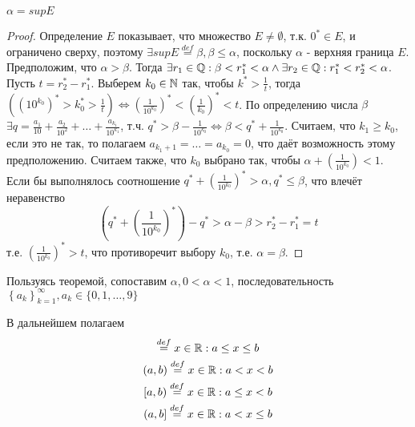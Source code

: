 \documentclass[main]{subfiles}
\begin{document}
\begin{theorem}
    $\alpha = supE$
\end{theorem}
\begin{proof}
    Определение $E$ показывает, что множество $E \neq \emptyset$, т.к. 
    $0^* \in E$, и ограничено сверху, поэтому $\exists supE \overset{def}{=} 
    \beta, \beta \leq \alpha$, поскольку $\alpha$ - верхняя граница $E$.
    Предположим, что $\alpha > \beta$. Тогда $\exists r_1 \in \mathbb{Q} : \beta <
    r_1^* < \alpha \wedge \exists r_2 \in \mathbb{Q} : r_1^* < r_2^* < \alpha$.
    Пусть $t = r_2^* - r_1^*$. Выберем $k_0 \in \mathbb{N}$ так, чтобы $k^* > \frac{1}{t}$,
    тогда $\left((10^{k_0})^* > k_0^* > \frac{1}{t}\right) \Leftrightarrow 
    \left(\frac{1}{10^{k_0}}\right)^* < \left(\frac{1}{k_0}\right)^* < t$.
    По определению числа $\beta$ $\exists q = \frac{a_1}{10} + \frac{a_2}{10^2} +
    \ldots + \frac{a_{k_1}}{10^{k_1}}$, т.ч. $q^* > \beta - \frac{1}{10^{k_0}}
    \Leftrightarrow \beta < q^* + \frac{1}{10^{k_0}}$. Считаем, что $k_1 \geq k_0$,
    если это не так, то полагаем $a_{k_1 + 1} = \ldots = a_{k_0} = 0$, что 
    даёт возможность этому предположению. Считаем также, что $k_0$ выбрано так,
    чтобы $\alpha + \left(\frac{1}{10^{k_0}}\right) < 1$. \\
    Если бы выполнялось соотношение $q^* + \left(\frac{1}{10^{k_0}}\right)^* > 
    \alpha, q^* \leq \beta$, что влечёт неравенство
    \begin{equation*}
        \left(q^* + \left(\frac{1}{10^{k_0}}\right)^*\right) - q^* > \alpha 
        -\beta > r_2^* - r_1^* = t
    \end{equation*}
    т.е. $\left(\frac{1}{10^{k_0}}\right)^* > t$, что противоречит выбору $k_0$,
    т.е. $\alpha = \beta$.
\end{proof}

Пользуясь теоремой, сопоставим $\alpha, 0 < \alpha < 1$, последовательность
$\left\{a_k\right\}_{k = 1}^{\infty}, a_k \in \{0, 1, \ldots, 9\}$

\begin{designation}
    В дальнейшем полагаем 
    \begin{gather*}
        [a, b] \overset{def}{=} {x \in \R : a \leq x \leq b} \\
        (a, b) \overset{def}{=} {x \in \R: a < x < b} \\
        [a, b) \overset{def}{=} {x \in \R: a \leq x < b} \\
        (a, b] \overset{def}{=} {x \in \R: a < x \leq b} 
    \end{gather*}
\end{designation}
\end{document}
